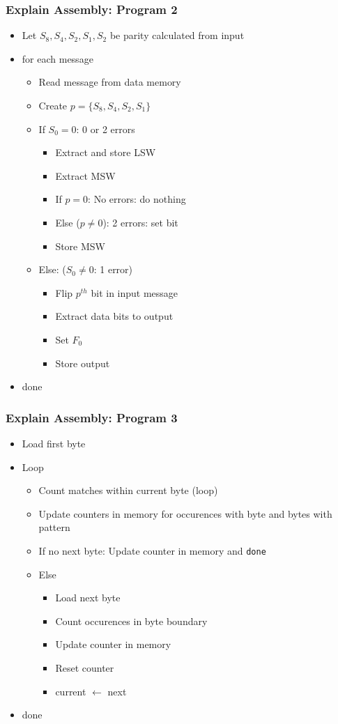 	\begin{frame}
		\frametitle{Explain Assembly: Program 2}
		\begin{itemize}
			\item Let $S_8, S_4, S_2, S_1, S_2$ be parity calculated from input
			\item for each message
				\begin{itemize}
					\item Read message from data memory
					\item Create $p=\{S_8, S_4, S_2, S_1\}$
					\item If $S_0 = 0$: 0 or 2 errors
						\begin{itemize}
							\item Extract and store LSW
							\item Extract MSW
							\item If $p = 0$: No errors: do nothing
							\item Else ($p \neq  0$): 2 errors: set bit
							\item Store MSW
						\end{itemize}
					\item Else: ($S_0 \neq 0$: 1 error)
						\begin{itemize}
							\item Flip $p^{th}$ bit in input message
							\item Extract data bits to output
							\item Set $F_0$
							\item Store output
						\end{itemize}
				\end{itemize}
			\item done
		\end{itemize}
	\end{frame}

	\begin{frame}
		\frametitle{Explain Assembly: Program 3}
		\begin{itemize}
			\item Load first byte
			\item Loop
				\begin{itemize}
					\item Count matches within current byte (loop)
					\item Update counters in memory for occurences with byte and bytes with pattern
					\item If no next byte: Update counter in memory and \texttt{done}
					\item Else
						\begin{itemize}
							\item Load next byte
							\item Count occurences in byte boundary
							\item Update counter in memory
							\item Reset counter
							\item current $\leftarrow$ next
						\end{itemize}
				\end{itemize}
			\item done
		\end{itemize}
	\end{frame}

